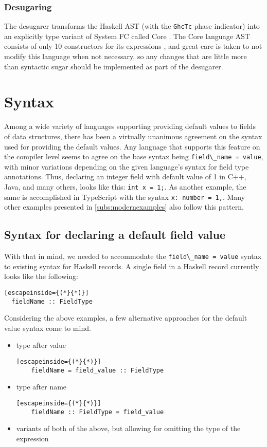 \documentclass[en]{pracamgr}
\newcommand{\code}[1]{\lstinline[breaklines=true]{#1}}
\begin{document}
\subsection{Desugaring}
The desugarer transforms the Haskell AST (with the \code{GhcTc} phase indicator) into an explicitly type variant of System FC called Core \cite{CoreWiki}.
The Core language AST consists of only 10 constructors for its expressions \cite{GHCCoreDef},
and great care is taken to not modify this language when not necessary, 
so any changes that are little more than syntactic sugar should be implemented as part of the desugarer.

\chapter{Syntax}\label{ch:syn}
Among a wide variety of languages supporting providing default values to fields of data structures, there has been a virtually unanimous agreement on the syntax used for providing the default values.
Any language that supports this feature on the compiler level seems to agree on the base syntax being \code{field\_name = value}, with minor variations depending on the given language's syntax for field type annotations.
Thus, declaring an integer field with default value of 1 in C++, Java, and many others, looks like this: \code{int x = 1;}.
As another example, the same is accomplished in TypeScript with the syntax \code{x: number = 1,}. 
Many other examples presented in \ref{subs:modernexamples} also follow this pattern.

\section{Syntax for declaring a default field value}
With that in mind, we needed to accommodate the \code{field\_name = value} syntax to existing syntax for Haskell records.
A single field in a Haskell record currently looks like the following:
\begin{lstlisting}[escapeinside={(*}{*)}]
  fieldName :: FieldType
\end{lstlisting}
Considering the above examples, a few alternative approaches for the default value syntax come to mind.

\begin{itemize}
  \item type after value
  \begin{lstlisting}[escapeinside={(*}{*)}]
    fieldName = field_value :: FieldType
  \end{lstlisting}
  \item type after name
  \begin{lstlisting}[escapeinside={(*}{*)}]
    fieldName :: FieldType = field_value
  \end{lstlisting}
  \item variants of both of the above, but allowing for omitting the type of the expression
\end{itemize}
\end{document}
